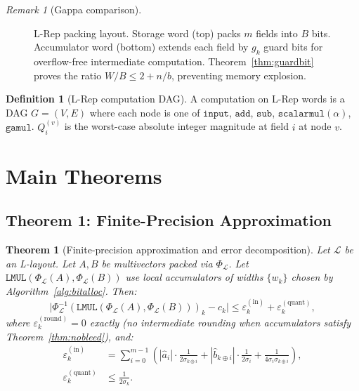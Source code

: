 \documentclass[11pt,a4paper]{article}
\theoremstyle{definition}
\newtheorem{definition}{Definition}[section]
\theoremstyle{plain}
\newtheorem{theorem}{Theorem}[section]
\theoremstyle{remark}
\newtheorem{remark}{Remark}[section]
\newcommand{\Pack}{\Phi_{\mathcal{L}}}
\newcommand{\Unpack}{\Phi^{-1}_{\mathcal{L}}}
\newcommand{\guardbit}{g}
\begin{document}
\begin{remark}[Gappa comparison]
\begin{figure}[h]
\caption{L-Rep packing layout.
Storage word (top) packs $m$ fields into $B$ bits.
Accumulator word (bottom) extends each field by $\guardbit_k$ guard bits
for overflow-free intermediate computation.
Theorem~\ref{thm:guardbit} proves the ratio $W/B \le 2 + n/b$,
preventing memory explosion.}
\label{fig:packing}
\end{figure}

\begin{definition}[L-Rep computation DAG]
A computation on L-Rep words is a DAG $G=(V,E)$ where each node is
one of $\mathtt{input}$, $\mathtt{add}$, $\mathtt{sub}$,
$\mathtt{scalarmul}(\alpha)$, $\mathtt{gamul}$.
$Q_i^{(v)}$ is the worst-case absolute integer magnitude at field $i$
at node $v$.
\end{definition}

\section{Main Theorems}
\label{sec:main}

\subsection{Theorem 1: Finite-Precision Approximation}
\label{sec:approx}

\begin{theorem}[Finite-precision approximation and error decomposition]
\label{thm:finite-approx}
Let $\mathcal{L}$ be an L-layout.
Let $A, B$ be multivectors packed via $\Pack$.
Let $\mathtt{LMUL}(\Pack(A),\Pack(B))$ use local accumulators of widths
$\{w_k\}$ chosen by Algorithm~\ref{alg:bitalloc}.
Then:
\begin{equation}\label{eq:error-main}
  \bigl|\Unpack(\mathtt{LMUL}(\Pack(A),\Pack(B)))_k - c_k\bigr|
  \le \varepsilon_k^{(\mathrm{in})} + \varepsilon_k^{(\mathrm{quant})},
\end{equation}
where $\varepsilon_k^{(\mathrm{round})} = 0$ exactly (no intermediate rounding when
accumulators satisfy Theorem~\ref{thm:nobleed}), and:
\begin{align}
  \varepsilon_k^{(\mathrm{in})}
    &= \sum_{i=0}^{m-1}\!\left(|\hat{a}_i|\cdot\tfrac{1}{2\sigma_{k\oplus i}}
      + |\hat{b}_{k\oplus i}|\cdot\tfrac{1}{2\sigma_i}
      + \tfrac{1}{4\sigma_i\sigma_{k\oplus i}}\right),\label{eq:eps-in}\\
  \varepsilon_k^{(\mathrm{quant})}
    &\le \tfrac{1}{2\sigma_k}.\label{eq:eps-quant}
\end{align}
\end{theorem}


\end{remark}
\end{document}
